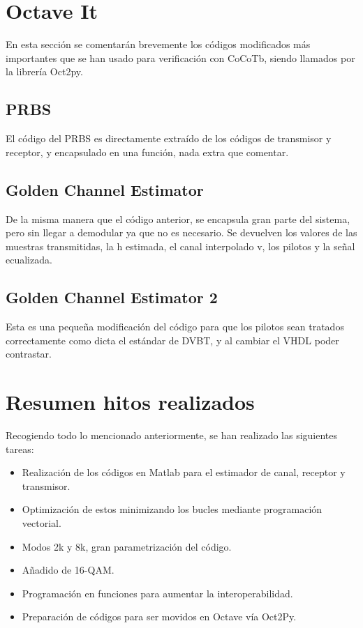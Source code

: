 \documentclass[11pt]{scrartcl} %
\begin{document}
\begin{preview}
\Newpage

\section{Octave It}

En esta sección se comentarán brevemente los códigos modificados más importantes que se han usado para verificación con CoCoTb, siendo llamados por la librería Oct2py.

\subsection{PRBS}

El código del PRBS es directamente extraído de los códigos de transmisor y receptor, y encapsulado en una función, nada extra que comentar.

\subsection{Golden Channel Estimator}

De la misma manera que el código anterior, se encapsula gran parte del sistema, pero sin llegar a demodular ya que no es necesario. Se devuelven los valores de las muestras transmitidas, la h estimada, el canal interpolado v, los pilotos y la señal ecualizada.

\subsection{Golden Channel Estimator 2}

Esta es una pequeña modificación del código para que los pilotos sean tratados correctamente como dicta el estándar de DVBT, y al cambiar el VHDL poder contrastar.

\section{Resumen hitos realizados}

Recogiendo todo lo mencionado anteriormente, se han realizado las siguientes tareas:

\begin{itemize}
	\item Realización de los códigos en Matlab para el estimador de canal, receptor y transmisor.
	\item Optimización de estos minimizando los bucles mediante programación vectorial.
	\item Modos 2k y 8k, gran parametrización del código.
	\item Añadido de 16-QAM.
	\item Programación en funciones para aumentar la interoperabilidad. 
	\item Preparación de códigos para ser movidos en Octave vía Oct2Py.
\end{itemize}


\end{preview}
\end{document}
